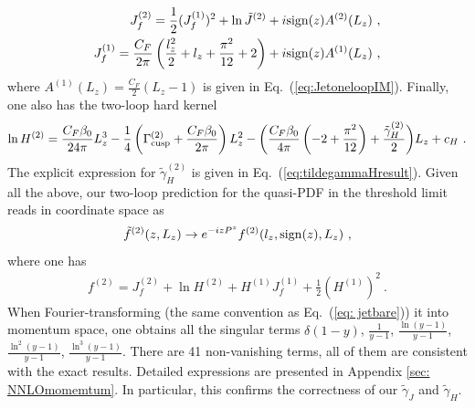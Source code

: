 \documentclass[a4paper,11pt]{article}
\begin{document}
\begin{align}\label{eq:resultJf2}
J_{f}^{(2)}=\frac{1}{2}(J_f^{(1)})^2+\ln \tilde J^{(2)}+i {\rm sign}(z) A^{(2)}(L_z) \ , \\ 
J_f^{(1)}=\frac{C_F}{2\pi}\left(\frac{l_z^2}{2}+l_z+\frac{\pi^2}{12}+2\right)+i{\rm sign}(z) A^{(1)}(L_z) \ , \label{eq:resultJf1}
\end{align}
where $A^{(1)}(L_z)= \frac{C_{F}}{2}(L_z-1)$ is given in Eq.~(\ref{eq:JetoneloopIM}).
Finally, one also has the two-loop hard kernel
\begin{align}\label{hardtwoloop}
\ln H^{(2)}=\frac{C_F\beta_0}{24\pi}L_z^3-\frac{1}{4}\left(\Gamma^{(2)}_{\rm cusp}+\frac{C_F\beta_0}{2\pi}\right)L_z^2-\bigg(\frac{C_F\beta_0}{4\pi}\left(-2+\frac{\pi^2}{12}\right)+\frac{\tilde \gamma_{H}^{(2)}}{2}\bigg)L_z+c_H \ .
\end{align}
The explicit expression for $\tilde \gamma_H^{(2)}$ is given in Eq.~(\ref{eq:tildegammaHresult}). 
Given all the above, our two-loop prediction for the quasi-PDF in the threshold limit reads in coordinate space as
\begin{align}
\tilde f^{(2)}(z,L_z)\rightarrow e^{-izP^z} f^{(2)}(l_z,{\rm sign}(z), L_z) \ , 
\end{align}
where one has
\begin{align}
 f^{(2)}=J_f^{(2)}+\ln H^{(2)}+H^{(1)}J_f^{(1)}+\frac{1}{2}(H^{(1)})^2 \ .
\end{align}
When Fourier-transforming (the same convention as Eq.~(\ref{eq: jetbare})) it into momentum space, one obtains all the singular terms $\delta(1-y)$, $\frac{1}{y-1}$, $\frac{\ln (y-1)}{y-1}$, $\frac{\ln^2(y-1)}{y-1}$, $\frac{\ln^3(y-1)}{y-1}$. There are 41 non-vanishing terms, all of them are consistent with the exact results. Detailed expressions are presented in Appendix \ref{sec: NNLOmomemtum}. In particular, this confirms the correctness of our $\tilde \gamma_J$ and $\tilde \gamma_H$. 
\end{document}
